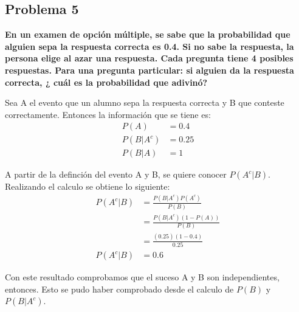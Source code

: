 \pagebreak
\subsection*{Problema 5}
\textbf{En un examen de opción múltiple, se sabe que la probabilidad que alguien sepa la respuesta correcta es 0.4. Si no sabe la respuesta, la persona elige al azar una respuesta. Cada pregunta tiene 4 posibles respuestas. Para una pregunta particular: si alguien da la respuesta correcta, ¿ cuál es la probabilidad que adivinó?}

Sea A el evento que un alumno sepa la respuesta correcta y B que conteste correctamente. Entonces la información que se tiene es:
\begin{align*}
    P(A)     & = 0.4  \\
    P(B|A^c) & = 0.25 \\
    P(B|A)   & =1
\end{align*}

A partir de la definción del evento A y B, se quiere conocer $P(A^c|B)$. Realizando el calculo se obtiene lo siguiente:
\begin{align*}
    P(A^c|B) & = \frac{P(B|A^c)P(A^c)}{P(B)}   \\
             & = \frac{P(B|A^c)(1-P(A))}{P(B)} \\
             & =\frac{(0.25)(1-0.4)}{0.25}     \\
    P(A^c|B) & = 0.6
\end{align*}

Con este resultado comprobamos que el suceso A y B son independientes, entonces. Esto se pudo haber comprobado desde el calculo de $P(B)$ y $P(B|A^c)$.